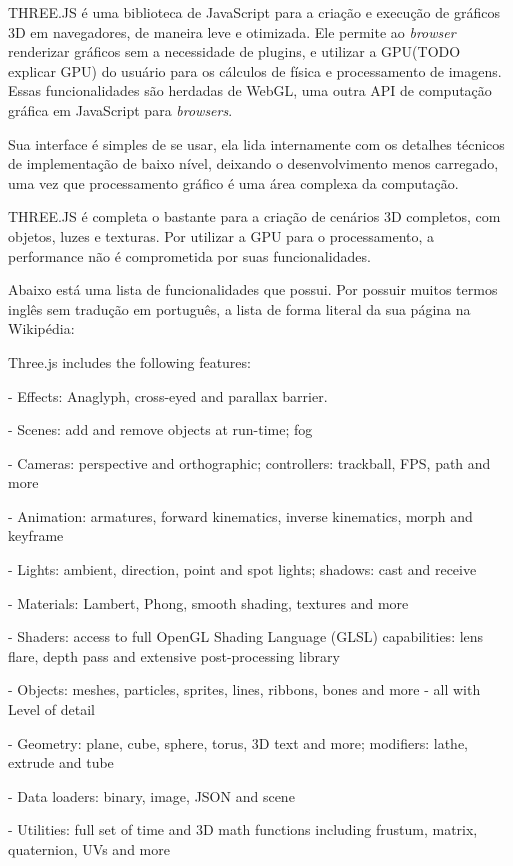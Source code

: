 \documentclass[a4paper,12pt]{article}
\begin{document}
THREE.JS é uma biblioteca de JavaScript para a criação e execução de gráficos 3D em navegadores, de maneira leve e otimizada. Ele permite ao \emph{browser} renderizar gráficos sem a necessidade de plugins, e utilizar a GPU(TODO explicar GPU) do usuário para os cálculos de física e processamento de imagens. Essas funcionalidades são herdadas de WebGL, uma outra API de computação gráfica em JavaScript para \emph{browsers}.

Sua interface é simples de se usar, ela lida internamente com os detalhes técnicos de implementação de baixo nível, deixando o desenvolvimento menos carregado, uma vez que processamento gráfico é uma área complexa da computação.

THREE.JS é completa o bastante para a criação de cenários 3D completos, com objetos, luzes e texturas. Por utilizar a GPU para o processamento, a performance não é comprometida por suas funcionalidades.

Abaixo está uma lista de funcionalidades que possui. Por possuir muitos termos inglês sem tradução em português, a lista de forma literal da sua página na Wikipédia:

Three.js includes the following features:

- Effects: Anaglyph, cross-eyed and parallax barrier.

- Scenes: add and remove objects at run-time; fog

- Cameras: perspective and orthographic; controllers: trackball, FPS, path and more

- Animation: armatures, forward kinematics, inverse kinematics, morph and keyframe

- Lights: ambient, direction, point and spot lights; shadows: cast and receive

- Materials: Lambert, Phong, smooth shading, textures and more

- Shaders: access to full OpenGL Shading Language (GLSL) capabilities: lens flare, depth pass and extensive post-processing library

- Objects: meshes, particles, sprites, lines, ribbons, bones and more - all with Level of detail

- Geometry: plane, cube, sphere, torus, 3D text and more; modifiers: lathe, extrude and tube

- Data loaders: binary, image, JSON and scene

- Utilities: full set of time and 3D math functions including frustum, matrix, quaternion, UVs and more
\end{document}
